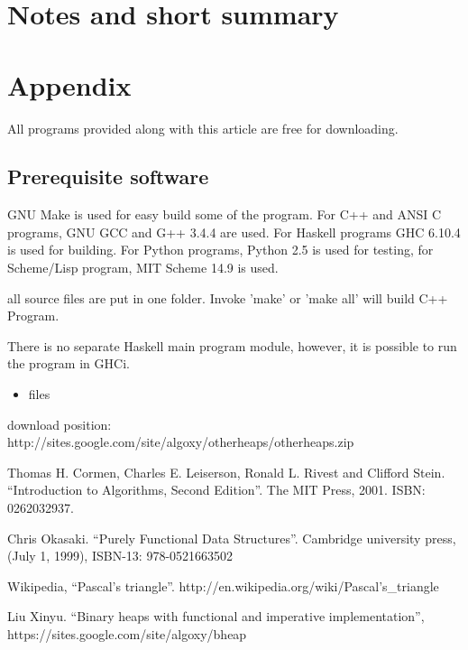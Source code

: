 \documentclass{article}
\begin{document}
\section{Notes and short summary}

\section{Appendix} \label{appendix}
All programs provided along with this article are free for
downloading.

\subsection{Prerequisite software}
GNU Make is used for easy build some of the program. For C++ and ANSI C programs,
GNU GCC and G++ 3.4.4 are used. 
For Haskell programs GHC 6.10.4 is used
for building. For Python programs, Python 2.5 is used for testing, for
Scheme/Lisp program, MIT Scheme 14.9 is used.

all source files are put in one folder. Invoke 'make' or 'make all'
will build C++ Program. 

There is no separate Haskell main program module, however, it is possible to run the program in GHCi.

\begin{itemize}
\item files

\end{itemize}

download position: http://sites.google.com/site/algoxy/otherheaps/otherheaps.zip

\begin{thebibliography}{99}

Thomas H. Cormen, Charles E. Leiserson, Ronald L. Rivest and Clifford Stein. ``Introduction to Algorithms, Second Edition''. The MIT Press, 2001. ISBN: 0262032937.

Chris Okasaki. ``Purely Functional Data Structures''. Cambridge university press, (July 1, 1999), ISBN-13: 978-0521663502

Wikipedia, ``Pascal's triangle''. http://en.wikipedia.org/wiki/Pascal's\_triangle

Liu Xinyu. ``Binary heaps with functional and imperative implementation'', https://sites.google.com/site/algoxy/bheap

\end{thebibliography}

\ifx\wholebook\relax \else
\end{document}
